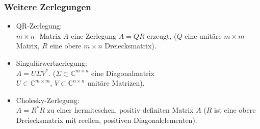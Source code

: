 \documentclass[hyperref={xetex}]{beamer}
\begin{document}
\begin{frame}[fragile]\frametitle{Weitere Zerlegungen}
\begin{itemize}
\item \alert{QR-Zerlegung}: \\
  $m \times n$- Matrix $A$ eine Zerlegung { $A=QR$} erzeugt,
  ($Q$ eine unitäre $m \times m$-Matrix, $R$ eine obere $m \times n$ Dreiecksmatrix).
\item \alert{Singulärwertzerlegung}: \\
  { $A=U \Sigma V^*$}. 
  ($\Sigma \subset \mathbb{C}^{m \times n}$ eine Diagonalmatrix \\
  $U \subset \mathbb{C}^{m \times m}$, $V \subset  \mathbb{C}^{n \times n}$ unitäre Matrizen). 

\item \alert{Cholesky-Zerlegung}: \\
  { $A=R^*R$} zu einer hermiteschen, positiv definiten Matrix
  $A$ ($R$ ist eine obere Dreiecksmatrix mit reellen, positiven
  Diagonalelementen). 
\end{itemize}


\end{frame}
\end{document}
